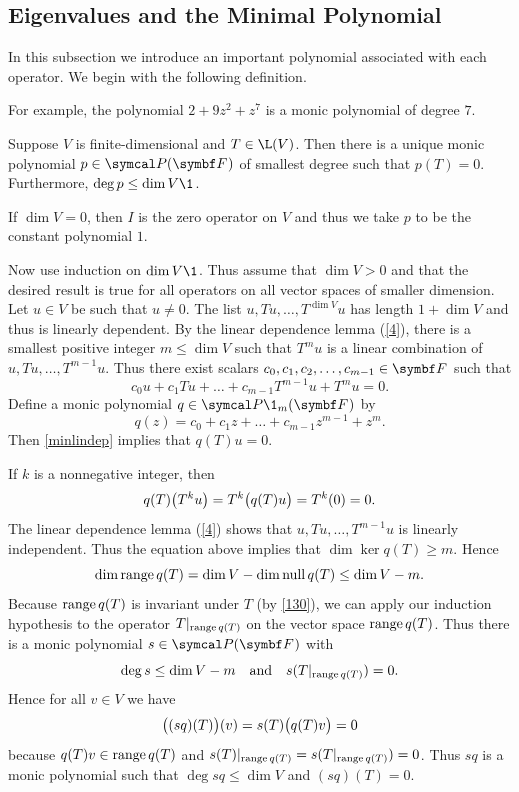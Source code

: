 \subsection{Eigenvalues and the Minimal Polynomial}

In this subsection we introduce an important polynomial associated with each operator. We begin with the following definition.


For example, the polynomial $2 + 9z^2 + z^7$ is a monic polynomial of degree $7$.

{Suppose $V$ is finite-dimensional and $T \in \L(V)$. Then there is a unique monic polynomial $p \in \P(\F{})$ of smallest degree such that $p(T) = 0$. Furthermore, $\deg p \le \dim V\1$.}

\proof
If $\dim V = 0$, then $I$ is the zero operator on $V$ and thus we take $p$ to be the constant polynomial $1$.

{
\addtolength{\abovedisplayskip}{-.01in} %
\addtolength{\belowdisplayskip}{-.01in}
Now use induction on $\dim V\1$. Thus assume that $\dim V > 0$ and that the desired result is true for all operators on all vector spaces of smaller dimension. Let
$u \in V$ be such that $u \ne 0$. The list $u, Tu, \ldots, T^{\dim V} u$ has length $1 + \dim V$ and thus is linearly dependent. By the linear dependence lemma (\ref{4}), there is a smallest positive integer $m \le \dim V$ such that $T^m u$ is a linear combination of
$u, Tu, \dots, T^{m-1} u$. Thus there exist scalars $c_0, c_1, c_2, \dots, c_{m-1} \in \F{}$ such that
\begin{equation} \label{minlindep}
c_0 u + c_1 Tu + \dots + c_{m-1} T^{m-1} u  + T^m u = 0.
\end{equation}%
Define a monic polynomial $q \in \P\1_m(\F{})$ by
\[
q(z) = c_0 + c_1 z + \dots + c_{m-1} z^{m-1} + z^m\!.
\]
Then \ref{minlindep} implies that $q(T)u = 0$.

\enlargethispage*{.11in} %

If $k$ is a nonnegative integer, then
\[
q(T) \paren[\big]{T^k u} = T^k \paren[\big]{ q(T)u } = T^k(0) = 0.
\]
The linear dependence lemma (\ref{4}) shows that $u, Tu, \dots, T^{m-1} u$ is linearly independent. Thus the equation above implies
that $\dim \ker q(T) \ge m$. Hence
\[
\dim \ran q(T) = \dim V - \dim \ker q(T) \le \dim V - m.
\]
Because $\ran q(T)$ is invariant under $T$ (by \ref{130}), we can apply our induction hypothesis to the operator $T|_{\ran q(T)}$ on the vector space $\ran q(T)$. Thus there is a monic polynomial $s \in \P(\F{})$ with
\[
\deg s \le \dim V-m \andd s( T|_{\ran q(T)}) = 0.
\]
Hence for all $v \in V$ we have
\[
\paren[\big]{(sq)(T)}(v) = s(T) \paren[\big]{ q(T) v } = 0
\]
because $q(T)v \in \ran q(T)$ and $s(T)|_{\ran q(T)} = s( T|_{\ran q(T)}) = 0$. Thus $sq$ is a monic polynomial such that $\deg sq \le \dim V$ and $(sq)(T) = 0$.
\\} %

